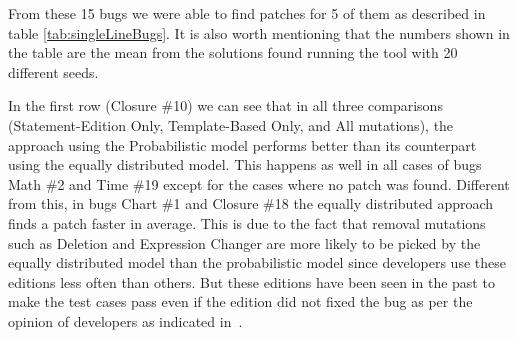 \documentclass[conference]{IEEEtran}
\newcommand{\ra}[1]{\renewcommand{\arraystretch}{#1}}
\begin{document}
From these 15 bugs we were able to find patches for 5 of them as described in table \ref{tab:singleLineBugs}. It is also worth mentioning that the numbers shown in the table are the mean from the solutions found running the tool with 20 different seeds. 

In the first row (Closure \#10) we can see that in all three comparisons (Statement-Edition Only, Template-Based Only, and All mutations), the approach using the Probabilistic model performs better than its counterpart using the equally distributed model. This happens as well in all cases of bugs Math \#2 and Time \#19 except for the cases where no patch was found. Different from this, in bugs Chart \#1 and Closure \#18 the equally distributed approach finds a patch faster in average. This is due to the fact that removal mutations such as Deletion and Expression Changer are more likely to be picked by the equally distributed model than the probabilistic model since developers use these editions less often than others. But these editions have been seen in the past to make the test cases pass even if the edition did not fixed the bug as per the opinion of developers as indicated in~\cite{kim2013}.


\begin{table}\centering
\ra{1.3}
\ra{1.3}
		\caption{Single line bugs With Human Injected Fault Localization}\label{tab:singleLineBugs}
\end{table}
\end{document}

